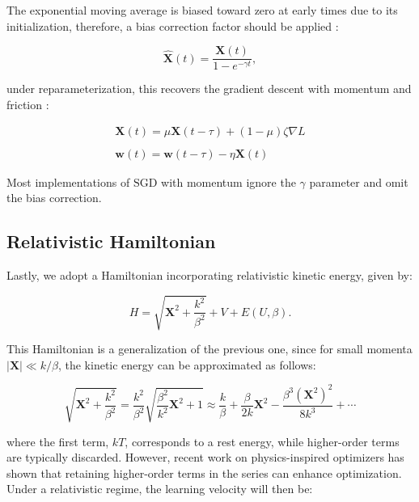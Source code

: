 \documentclass[12pt]{article}
\begin{document}
The exponential moving average is biased toward zero at early times due to its initialization, therefore, a bias correction factor should be applied \cite{kingma_adam}:

\begin{equation}
\hat{\mathbf{X}}(t) = \frac{\mathbf{X}(t)}{1-e^{-\gamma t}},
\end{equation}

under reparameterization, this recovers the gradient descent with momentum and friction \cite{bottou_sgd}:

\begin{equation}
\begin{aligned}
\mathbf{X}(t) = \mu \mathbf{X}(t-\tau) + (1-\mu) \zeta \nabla L 
\\
\\
\mathbf{w}(t) = \mathbf{w}(t-\tau) - \eta \mathbf{X}(t)
\end{aligned}
\end{equation}

Most implementations of $\text{SGD}$ with momentum ignore the $\gamma$ parameter and omit the bias correction.

\subsection*{Relativistic Hamiltonian}

Lastly, we adopt a Hamiltonian incorporating relativistic kinetic energy, given by:

\begin{equation}
H = \sqrt{\mathbf{X}^2 + \frac{k^2}{\beta^2}} + V + E(U, \beta).
\end{equation}

This Hamiltonian is a generalization of the previous one, since for small momenta $|\mathbf{X}| \ll k/\beta$, the kinetic energy can be approximated as follows:

\begin{equation}
\sqrt{\mathbf{X}^2+\frac{k^2}{\beta^2}} = \frac{k^2}{\beta^2} \sqrt{\frac{\beta^2}{k^2}\mathbf{X}^2 + 1} \approx \frac{k}{\beta} + \frac{\beta}{2k}\mathbf{X}^2 - \frac{\beta^3 (\mathbf{X}^2)^2}{8k^3} + \cdots
\end{equation}

where the first term, $kT$, corresponds to a rest energy, while higher-order terms are typically discarded. However, recent work on physics-inspired optimizers \cite{vaidhyanathan_vradam} has shown that retaining higher-order terms in the series can enhance optimization. Under a relativistic regime, the learning velocity will then be:
\end{document}
